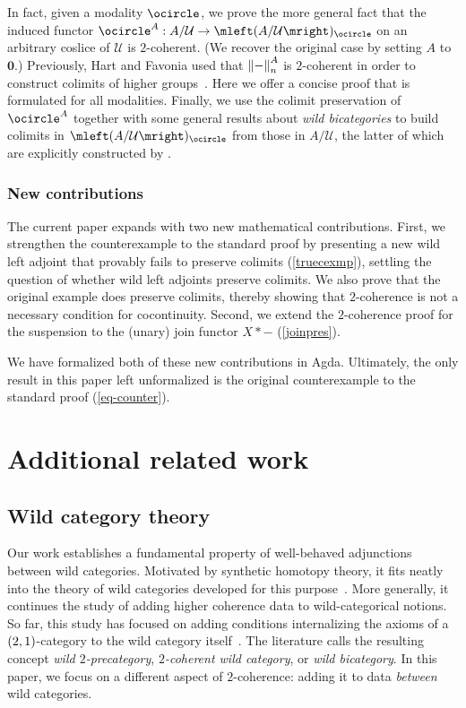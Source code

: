 \documentclass[10pt,a4paper]{article}
\theoremstyle{definition}
\theoremstyle{remark}
\newcommand{\U}{\mathcal{U}}
\newcommand{\0}{\mathbf{0}}
\newcommand{\1}{\mathbf{1}}
\newcommand{\2}{\mathbf{2}}
\newcommand{\lN}{\mleft\lVert}
\newcommand{\rN}{\mright\rVert}
\newcommand{\modal}{{\ensuremath{\ocircle}}}
\begin{document}
In fact, given a modality $\modal$, we prove the more general fact that the induced functor $\modal^A : A/\U \to \mleft(A/\U\mright)_{\modal}$ on an arbitrary coslice of $\U$ is $2$-coherent. (We recover the original case by setting $A$ to $\0$.) Previously, Hart and Favonia used that $\lN{-}\rN_n^A$ is $2$-coherent in order to construct colimits of higher groups~\cite[Section 7]{CSL25}. Here we offer a concise proof that is formulated for all modalities. Finally, we use the colimit preservation of $\modal^A$ together with some general results about \emph{wild bicategories} to build colimits in $\mleft(A/\U\mright)_{\modal}$ from those in $A/\U$, the latter of which are explicitly constructed by \cite[Section 5]{CSL25}.

\subsubsection*{New contributions}
The current paper expands \cite{lapccsl} with two new mathematical contributions. First, we strengthen the counterexample to the standard proof by presenting a new wild left adjoint that provably fails to preserve colimits (\autoref{truecexmp}), settling the question of whether wild left adjoints preserve colimits. We also prove that the original example does preserve colimits, thereby showing that $2$-coherence is not a necessary condition for cocontinuity. Second, we extend the $2$-coherence proof for the suspension to the (unary) join functor $X \ast {-}$ (\autoref{joinpres}). 

We have formalized both of these new contributions in Agda. Ultimately, the only result in this paper left unformalized is the original counterexample to the standard proof (\autoref{eq-counter}).

\section{Additional related work}

\subsection{Wild category theory}

Our work establishes a fundamental property of well-behaved adjunctions between wild categories. Motivated by synthetic homotopy theory, it fits neatly into the theory of wild categories developed for this purpose~\cite{Hur, RK, smashmon}. More generally, it continues the study of adding higher coherence data to wild-categorical notions. So far, this study has focused on adding conditions internalizing the axioms of a $\mleft(2,1\mright)$-category to the wild category itself~\cite{chen, CK, CSL25}. The literature calls the resulting concept \emph{wild $2$-precategory}, \emph{$2$-coherent wild category}, or \emph{wild bicategory}.
In this paper, we focus on a different aspect of $2$-coherence: adding it to data \emph{between} wild categories.   
\end{document}
